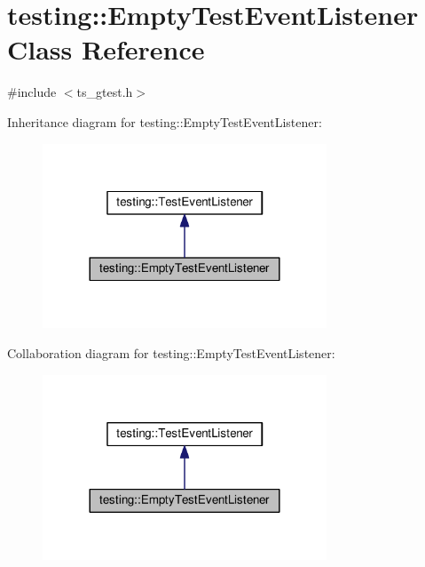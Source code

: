 \hypertarget{classtesting_1_1EmptyTestEventListener}{\section{testing\-:\-:Empty\-Test\-Event\-Listener Class Reference}
\label{classtesting_1_1EmptyTestEventListener}
}


{\ttfamily \#include $<$ts\-\_\-gtest.\-h$>$}



Inheritance diagram for testing\-:\-:Empty\-Test\-Event\-Listener\-:\nopagebreak
\begin{figure}[H]
\begin{center}
\leavevmode
\includegraphics[width=240pt]{classtesting_1_1EmptyTestEventListener__inherit__graph}
\end{center}
\end{figure}


Collaboration diagram for testing\-:\-:Empty\-Test\-Event\-Listener\-:\nopagebreak
\begin{figure}[H]
\begin{center}
\leavevmode
\includegraphics[width=240pt]{classtesting_1_1EmptyTestEventListener__coll__graph}
\end{center}
\end{figure}
